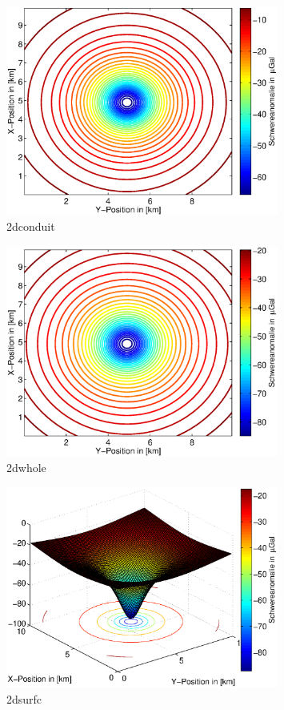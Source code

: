 \documentclass[12pt,a4paper]{scrartcl}
\begin{document}
\begin{figure}[htb]
\centering
\includegraphics[width=0.8\textwidth]{../figures/2dconduit_contour}
\caption{2dconduit}
\label{2dconduit}
\end{figure}

\begin{figure}[htb]
\centering
\includegraphics[width=0.8\textwidth]{../figures/2dwhole_contour}
\caption{2dwhole}
\label{2dwhole}
\end{figure}

\begin{figure}[htb]
\centering
\includegraphics[width=0.8\textwidth]{../figures/2dwhole_surfc}
\caption{2dsurfc}
\label{2dsurfc}
\end{figure}
\end{document}
